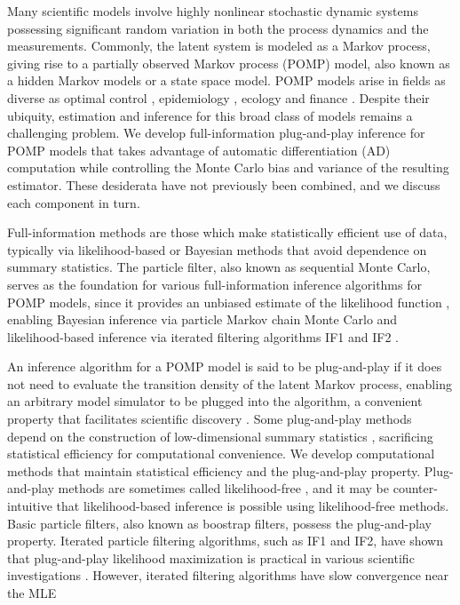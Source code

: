 \documentclass[numsec,webpdf,modern,medium,namedate]{oup-authoring-template}
\begin{document}
Many scientific models involve highly nonlinear stochastic dynamic systems possessing significant random variation in both the process dynamics and the measurements.
Commonly, the latent system is modeled as a Markov process, giving rise to a partially observed Markov process (POMP) model, also known as a hidden Markov models or a state space model.
POMP models arise in fields as diverse as optimal control \citep{singh22}, epidemiology \citep{he10, stocks17}, ecology \citep{knape12} and finance \citep{kim08, breto14}.
Despite their ubiquity, estimation and inference for this broad class of models remains a challenging problem.
We develop full-information plug-and-play inference for POMP models that takes advantage of automatic differentiation (AD) computation while controlling the Monte Carlo bias and variance of the resulting estimator.
These desiderata have not previously been combined, and we discuss each component in turn.

Full-information methods are those which make statistically efficient use of data, typically via likelihood-based or Bayesian methods that avoid dependence on summary statistics.
The particle filter, also known as sequential Monte Carlo, serves as the foundation for various full-information inference algorithms for POMP models, since it provides an unbiased estimate of the likelihood function \citep{delMoral04}, enabling Bayesian inference via particle Markov chain Monte Carlo \citep{andrieu10} and likelihood-based inference via iterated filtering algorithms IF1 \citep{ionides06-pnas} and IF2 \citep{ionides15}.

An inference algorithm for a POMP model is said to be plug-and-play if it does not need to evaluate the transition density of the latent Markov process, enabling an arbitrary model simulator to be plugged into the algorithm, a convenient property that facilitates scientific discovery \citep{he10}.
Some plug-and-play methods depend on the construction of low-dimensional summary statistics \citep{wood10,toni09}, sacrificing statistical efficiency for computational convenience.
We develop computational methods that maintain statistical efficiency and the plug-and-play property.
Plug-and-play methods are sometimes called likelihood-free \citep{owen15}, and it may be counter-intuitive that likelihood-based inference is possible using likelihood-free methods. 
Basic particle filters, also known as boostrap filters, possess the plug-and-play property.
Iterated particle filtering algorithms, such as IF1 and IF2, have shown that plug-and-play likelihood maximization is practical in various scientific investigations \citep{king08,blake14,pons-salort18,subramanian21,fox22,drake23}.
However, iterated filtering algorithms have slow convergence near the MLE \citep{doucet13}
\end{document}
